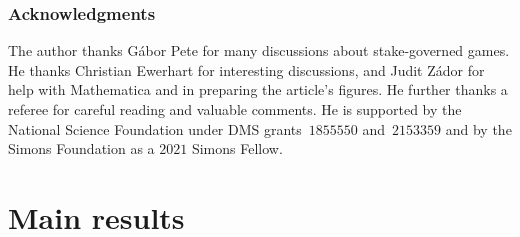 \documentclass[letterpaper,11pt,oneside,reqno]{amsbook}
\numberwithin{figure}{chapter}
\theoremstyle{definition}
\theoremstyle{definition}
\theoremstyle{definition}
\theoremstyle{definition}
\theoremstyle{definition}
\begin{document}





\subsection{Acknowledgments}
The author thanks G\'abor Pete for many discussions about stake-governed games. He thanks Christian Ewerhart for interesting discussions, and Judit Z\'ador for help with Mathematica and in preparing the article's figures.  He further thanks a referee for careful reading and valuable comments.
He is supported by the National Science Foundation under DMS grants~$1855550$ and~$2153359$ and by the Simons Foundation as a $2021$ Simons Fellow.




\chapter{Main results}\label{c.speclost}
\end{document}
